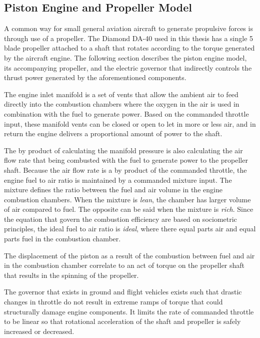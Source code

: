 \documentclass[12pt]{report}
\begin{document}
\subsection{Piston Engine and Propeller Model}
A common way for small general aviation aircraft to generate propulsive forces is through use of a propeller. The Diamond DA-40 used in this thesis has a single 5 blade propeller attached to a shaft that rotates according to the torque generated by the aircraft engine. The following section describes the piston engine model, its accompanying propeller, and the electric governor that indirectly controls the thrust power generated by the aforementioned components.

The engine inlet manifold is a set of vents that allow the ambient air to feed directly into the combustion chambers where the oxygen in the air is used in combination with the fuel to generate power. Based on the commanded throttle input, these manifold vents can be closed or open to let in more or less air, and in return the engine delivers a proportional amount of power to the shaft.

The by product of calculating the manifold pressure is also calculating the air flow rate that being combusted with the fuel to generate power to the propeller shaft. Because the air flow rate is a by product of the commanded throttle, the engine fuel to air ratio is maintained by a commanded mixture input. The mixture defines the ratio between the fuel and air volume in the engine combustion chambers. When the mixture is \textit{lean}, the chamber has larger volume of air compared to fuel. The opposite can be said when the mixture is \textit{rich}. Since the equation that govern the combustion efficiency are based on sociometric principles, the ideal fuel to air ratio is \textit{ideal}, where there equal parts air and equal parts fuel in the combustion chamber.

The displacement of the piston as a result of the combustion between fuel and air in the combustion chamber correlate to an act of torque on the propeller shaft that results in the spinning of the propeller.

The governor that exists in ground and flight vehicles exists such that drastic changes in throttle do not result in extreme ramps of torque that could structurally damage engine components. It limits the rate of commanded throttle to be linear so that rotational acceleration of the shaft and propeller is safely increased or decreased.
\end{document}
